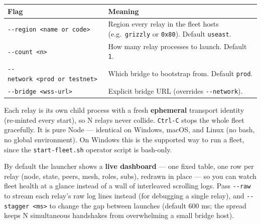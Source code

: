 \documentclass[
  nobib]{tufte-handout}
\newcounter{none} %
\renewcommand{\subsubsection}[1]{\medskip\par\noindent{\normalsize\bfseries #1}\par\nobreak\smallskip}
\begin{document}
{\def\LTcaptype{none} %
\begin{longtable}[]{@{}
  >{\raggedright\arraybackslash}p{}
  >{\raggedright\arraybackslash}p{}@{}}
\toprule\noalign{}
\begin{minipage}[b]{\linewidth}\raggedright
Flag
\end{minipage} & \begin{minipage}[b]{\linewidth}\raggedright
Meaning
\end{minipage} \\
\midrule\noalign{}
\endhead
\bottomrule\noalign{}
\endlastfoot
\texttt{-\/-region\ \textless{}name\ or\ code\textgreater{}} & Region
every relay in the fleet hosts (e.g.~\texttt{grizzly} or \texttt{0x80}).
Default \texttt{useast}. \\
\texttt{-\/-count\ \textless{}n\textgreater{}} & How many relay
processes to launch. Default \texttt{1}. \\
\texttt{-\/-network\ \textless{}prod\ or\ testnet\textgreater{}} & Which
bridge to bootstrap from. Default \texttt{prod}. \\
\texttt{-\/-bridge\ \textless{}wss-url\textgreater{}} & Explicit bridge
URL (overrides \texttt{-\/-network}). \\
\end{longtable}
}

Each relay is its own child process with a fresh \textbf{ephemeral}
transport identity (re-minted every start), so N relays never collide.
\texttt{Ctrl-C} stops the whole fleet gracefully. It is pure Node ---
identical on Windows, macOS, and Linux (no bash, no global environment).
On Windows this is the supported way to run a fleet, since the
\texttt{start-fleet.sh} operator script is bash-only.

By default the launcher shows a \textbf{live dashboard} --- one fixed
table, one row per relay (node, state, peers, mesh, roles, subs),
redrawn in place --- so you can watch fleet health at a glance instead
of a wall of interleaved scrolling logs. Pass \texttt{-\/-raw} to stream
each relay's raw log lines instead (for debugging a single relay), and
\texttt{-\/-stagger\ \textless{}ms\textgreater{}} to change the gap
between launches (default 600 ms; the spread keeps N simultaneous
handshakes from overwhelming a small bridge host).

\subsubsection{Configuration (env)}\label{configuration-env}
\end{document}
